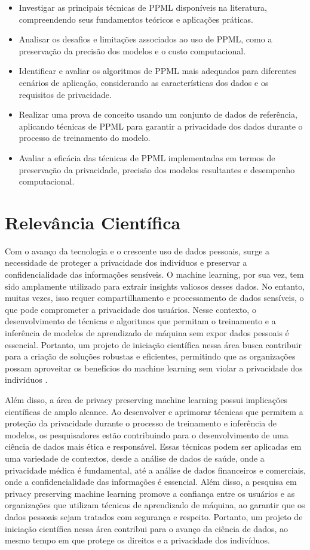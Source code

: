 \documentclass{article}
\begin{document}
\begin{itemize}
  \item Investigar as principais técnicas de PPML disponíveis na literatura, compreendendo seus fundamentos teóricos e aplicações práticas.
  \item Analisar os desafios e limitações associados ao uso de PPML, como a preservação da precisão dos modelos e o custo computacional.
  \item Identificar e avaliar os algoritmos de PPML mais adequados para diferentes cenários de aplicação, considerando as características dos dados e os requisitos de privacidade.
  \item Realizar uma prova de conceito usando um conjunto de dados de referência, aplicando técnicas de PPML para garantir a privacidade dos dados durante o processo de treinamento do modelo.
  \item Avaliar a eficácia das técnicas de PPML implementadas em termos de preservação da privacidade, precisão dos modelos resultantes e desempenho computacional.
\end{itemize}

\section{Relevância Científica}

Com o avanço da tecnologia e o crescente uso de dados pessoais, surge a necessidade de proteger a privacidade dos indivíduos e preservar a confidencialidade das informações sensíveis. O machine learning, por sua vez, tem sido amplamente utilizado para extrair insights valiosos desses dados. No entanto, muitas vezes, isso requer compartilhamento e processamento de dados sensíveis, o que pode comprometer a privacidade dos usuários. Nesse contexto, o desenvolvimento de técnicas e algoritmos que permitam o treinamento e a inferência de modelos de aprendizado de máquina sem expor dados pessoais é essencial. Portanto, um projeto de iniciação científica nessa área busca contribuir para a criação de soluções robustas e eficientes, permitindo que as organizações possam aproveitar os benefícios do machine learning sem violar a privacidade dos indivíduos \cite{koti2021swift}.

Além disso, a área de privacy preserving machine learning possui implicações científicas de amplo alcance. Ao desenvolver e aprimorar técnicas que permitem a proteção da privacidade durante o processo de treinamento e inferência de modelos, os pesquisadores estão contribuindo para o desenvolvimento de uma ciência de dados mais ética e responsável. Essas técnicas podem ser aplicadas em uma variedade de contextos, desde a análise de dados de saúde, onde a privacidade médica é fundamental, até a análise de dados financeiros e comerciais, onde a confidencialidade das informações é essencial. Além disso, a pesquisa em privacy preserving machine learning promove a confiança entre os usuários e as organizações que utilizam técnicas de aprendizado de máquina, ao garantir que os dados pessoais sejam tratados com segurança e respeito. Portanto, um projeto de iniciação científica nessa área contribui para o avanço da ciência de dados, ao mesmo tempo em que protege os direitos e a privacidade dos indivíduos.
\end{document}
